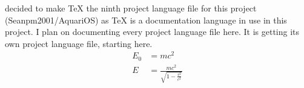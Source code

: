 \documentclass{article} %
\title{\ProjectLanguageFileNine} %
\begin{document}
  \maketitle
  \I decided to make TeX the ninth project language file for this project (Seanpm2001/AquariOS) as TeX is a documentation language in use in this project. I plan on documenting every project language file here. It is getting its own project language file, starting here.
  \begin{align}
    E_0 &= mc^2 \\
    E &= \frac{mc^2}{\sqrt{1-\frac{v^2}{c^2}}}
  \end{align} 
\end{document}
